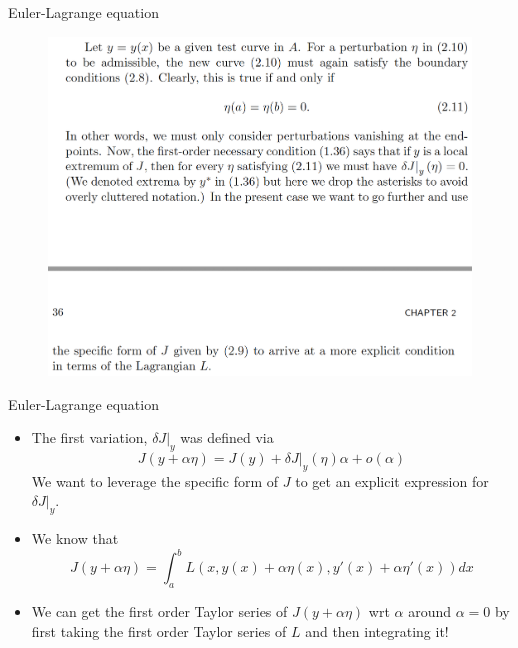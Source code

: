 \documentclass{beamer}
\begin{document}
\begin{frame}{Euler-Lagrange equation}
    \begin{figure}
        \centering
        \includegraphics[width=0.9\linewidth]{ch2/fig10.png}
    \end{figure}
\end{frame}

\begin{frame}{Euler-Lagrange equation}
    \begin{itemize}
        \item The first variation, $\delta J\vert_y$ was defined via
        \begin{equation}
            J(y + \alpha \eta) = J(y) + \delta J\vert_y(\eta) \alpha + o(\alpha)
        \end{equation}
        We want to leverage the specific form of $J$ to get an explicit expression for $\delta J\vert_y$.
        \item We know that
        \begin{equation}
            J(y + \alpha \eta) = \int_a^b L(x, y(x) + \alpha \eta(x), y'(x) + \alpha \eta'(x))dx
        \end{equation}
        \item We can get the first order Taylor series of $J(y + \alpha \eta)$ wrt $\alpha$ around $\alpha=0$ by first taking the first order Taylor series of $L$ and then integrating it!
    \end{itemize}
\end{frame}
\end{document}
